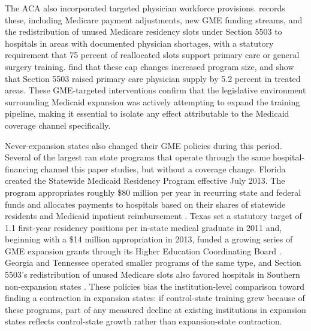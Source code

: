 The ACA also incorporated targeted physician workforce provisions. \textcite{heisler2013} records these, including Medicare payment adjustments, new GME funding streams, and the redistribution of unused Medicare residency slots under Section 5503 to hospitals in areas with documented physician shortages, with a statutory requirement that 75 percent of reallocated slots support primary care or general surgery training. \textcite{mcnamara2025a} find that these cap changes increased program size, and \textcite{mcnamara2025b} show that Section 5503 raised primary care physician supply by 5.2 percent in treated areas. These GME-targeted interventions confirm that the legislative environment surrounding Medicaid expansion was actively attempting to expand the training pipeline, making it essential to isolate any effect attributable to the Medicaid coverage channel specifically.

Never-expansion states also changed their GME policies during this period. Several of the largest ran state programs that operate through the same hospital-financing channel this paper studies, but without a coverage change. Florida created the Statewide Medicaid Residency Program effective July 2013. The program appropriates roughly \$80 million per year in recurring state and federal funds and allocates payments to hospitals based on their shares of statewide residents and Medicaid inpatient reimbursement \autocite{oppaga2023}. Texas set a statutory target of 1.1 first-year residency positions per in-state medical graduate in 2011 and, beginning with a \$14 million appropriation in 2013, funded a growing series of GME expansion grants through its Higher Education Coordinating Board \autocite{thecb2024}. Georgia and Tennessee operated smaller programs of the same type, and Section 5503's redistribution of unused Medicare slots also favored hospitals in Southern non-expansion states \autocite{mcnamara2025b}. These policies bias the institution-level comparison toward finding a contraction in expansion states: if control-state training grew because of these programs, part of any measured decline at existing institutions in expansion states reflects control-state growth rather than expansion-state contraction.


